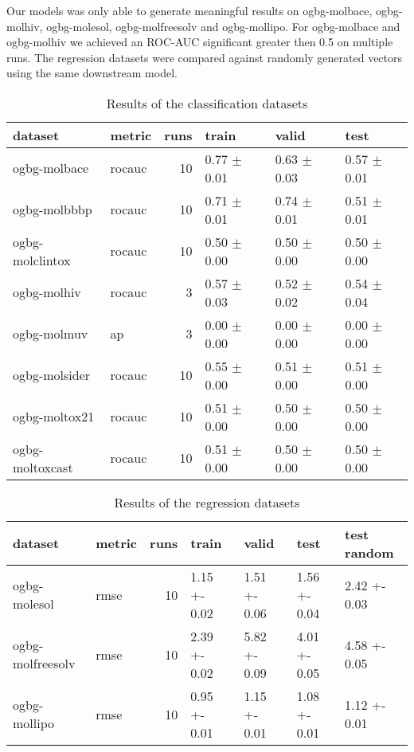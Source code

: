 Our models was only able to generate meaningful results on ogbg-molbace, ogbg-molhiv, ogbg-molesol, ogbg-molfreesolv and ogbg-mollipo. For ogbg-molbace and ogbg-molhiv we achieved an ROC-AUC significant greater then 0.5 on multiple runs. The regression datasets were compared against randomly generated vectors using the same downstream model.

\begin{table}[h!]
    \centering
    \begin{tabular}{llrlll}
        \toprule
        dataset         & metric & runs & train           & valid           & test            \\
        \midrule
        ogbg-molbace    & rocauc & 10   & 0.77 $\pm$ 0.01 & 0.63 $\pm$ 0.03 & 0.57 $\pm$ 0.01 \\
        ogbg-molbbbp    & rocauc & 10   & 0.71 $\pm$ 0.01 & 0.74 $\pm$ 0.01 & 0.51 $\pm$ 0.01 \\
        ogbg-molclintox & rocauc & 10   & 0.50 $\pm$ 0.00 & 0.50 $\pm$ 0.00 & 0.50 $\pm$ 0.00 \\
        ogbg-molhiv     & rocauc & 3    & 0.57 $\pm$ 0.03 & 0.52 $\pm$ 0.02 & 0.54 $\pm$ 0.04 \\
        ogbg-molmuv     & ap     & 3    & 0.00 $\pm$ 0.00 & 0.00 $\pm$ 0.00 & 0.00 $\pm$ 0.00 \\
        ogbg-molsider   & rocauc & 10   & 0.55 $\pm$ 0.00 & 0.51 $\pm$ 0.00 & 0.51 $\pm$ 0.00 \\
        ogbg-moltox21   & rocauc & 10   & 0.51 $\pm$ 0.00 & 0.50 $\pm$ 0.00 & 0.50 $\pm$ 0.00 \\
        ogbg-moltoxcast & rocauc & 10   & 0.51 $\pm$ 0.00 & 0.50 $\pm$ 0.00 & 0.50 $\pm$ 0.00 \\
        \bottomrule
    \end{tabular}

    \caption{Results of the classification datasets}
    \label{table:ogbg-classification_results}
\end{table}

\begin{table}[h!]
    \centering
    \begin{tabular}{llrllll}
        \toprule
        dataset          & metric & runs & train        & valid        & test         & test random  \\
        \midrule
        ogbg-molesol     & rmse   & 10   & 1.15 +- 0.02 & 1.51 +- 0.06 & 1.56 +- 0.04 & 2.42 +- 0.03 \\
        ogbg-molfreesolv & rmse   & 10   & 2.39 +- 0.02 & 5.82 +- 0.09 & 4.01 +- 0.05 & 4.58 +- 0.05 \\
        ogbg-mollipo     & rmse   & 10   & 0.95 +- 0.01 & 1.15 +- 0.01 & 1.08 +- 0.01 & 1.12 +- 0.01 \\
        \bottomrule
    \end{tabular}
    \caption{Results of the regression datasets}
    \label{table:ogbg-regression_results}
\end{table}



